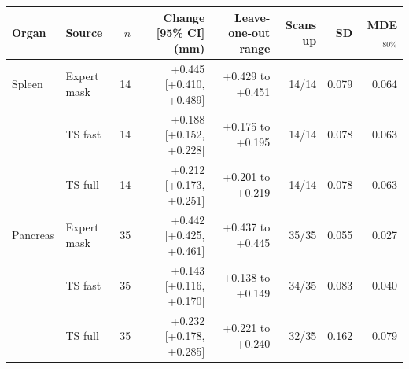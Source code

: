 \begin{tabular}{llrrrrrr}
\toprule
Organ & Source & $n$ & Change [95\% CI] (mm) & Leave-one-out range & Scans up & SD & MDE$_{80\%}$ \\
\midrule
Spleen & Expert mask & 14 & +0.445 [+0.410, +0.489] & +0.429 to +0.451 & 14/14 & 0.079 & 0.064 \\
 & TS fast & 14 & +0.188 [+0.152, +0.228] & +0.175 to +0.195 & 14/14 & 0.078 & 0.063 \\
 & TS full & 14 & +0.212 [+0.173, +0.251] & +0.201 to +0.219 & 14/14 & 0.078 & 0.063 \\
\midrule
Pancreas & Expert mask & 35 & +0.442 [+0.425, +0.461] & +0.437 to +0.445 & 35/35 & 0.055 & 0.027 \\
 & TS fast & 35 & +0.143 [+0.116, +0.170] & +0.138 to +0.149 & 34/35 & 0.083 & 0.040 \\
 & TS full & 35 & +0.232 [+0.178, +0.285] & +0.221 to +0.240 & 32/35 & 0.162 & 0.079 \\
\bottomrule
\end{tabular}
